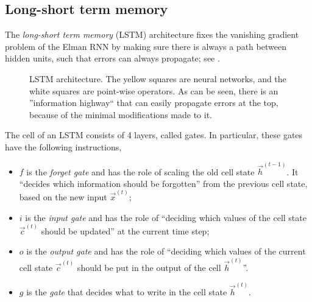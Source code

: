 \subsection{Long-short term memory}

The \textit{long-short term memory} (LSTM) architecture \citep{hochreiter1997long} fixes the
vanishing gradient problem of the Elman RNN by making sure there is always a path between hidden
units, such that errors can always propagate; see .

\begin{figure}
    \centering
    \caption{LSTM architecture. The yellow squares are neural networks, and the white squares are point-wise operators. As can be seen, there is an ''information highway`` that can easily propagate errors at the top, because of the minimal modifications made to it.}
    \label{fig:lstm}
\end{figure}

The cell of an LSTM consists of 4 layers, called gates. In particular, these gates have the
following instructions,
\begin{itemize}
    \item $f$ is the \textit{forget gate} and has the role of scaling the old cell state
          $\vec{h}^{(t-1)}$. It ``decides which information should be forgotten'' from the previous
          cell state, based on the new input $\vec{x}^{(t)}$;

    \item $i$ is the \textit{input gate} and has the role of ``deciding which values of the cell state $\vec{c}^{(t)}$
          should be updated'' at the current time step;

    \item $o$ is the \textit{output gate} and has the role of ``deciding which values of the current
          cell state $\vec{c}^{(t)}$ should be put in the output of the cell $\vec{h}^{(t)}$''.

    \item $g$ is the \textit{gate} that decides what to write in the cell state $\vec{h}^{(t)}$.
\end{itemize}

